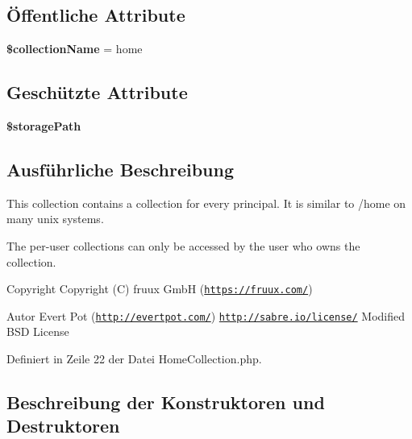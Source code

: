 \subsection*{Öffentliche Attribute}
\begin{DoxyCompactItemize}
\item 
\mbox{\label{class_sabre_1_1_d_a_v_a_c_l_1_1_f_s_1_1_home_collection_ae400f4aab4047519000d797b5441366f}} 
{\bfseries \$collection\+Name} = \textquotesingle{}home\textquotesingle{}
\end{DoxyCompactItemize}
\subsection*{Geschützte Attribute}
\begin{DoxyCompactItemize}
\item 
\mbox{\label{class_sabre_1_1_d_a_v_a_c_l_1_1_f_s_1_1_home_collection_ac769e1dae4a826f4004fff5a397c38dc}} 
{\bfseries \$storage\+Path}
\end{DoxyCompactItemize}


\subsection{Ausführliche Beschreibung}
This collection contains a collection for every principal. It is similar to /home on many unix systems.

The per-\/user collections can only be accessed by the user who owns the collection.

\begin{DoxyCopyright}{Copyright}
Copyright (C) fruux GmbH (\href{https://fruux.com/}{\tt https\+://fruux.\+com/}) 
\end{DoxyCopyright}
\begin{DoxyAuthor}{Autor}
Evert Pot (\href{http://evertpot.com/}{\tt http\+://evertpot.\+com/})  \href{http://sabre.io/license/}{\tt http\+://sabre.\+io/license/} Modified B\+SD License 
\end{DoxyAuthor}


Definiert in Zeile 22 der Datei Home\+Collection.\+php.



\subsection{Beschreibung der Konstruktoren und Destruktoren}
\mbox{\label{class_sabre_1_1_d_a_v_a_c_l_1_1_f_s_1_1_home_collection_a247ea82e5b929d9ec808b5c08ec284ca}} 
